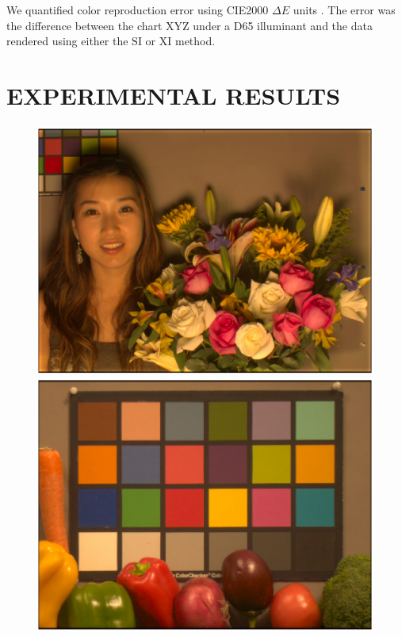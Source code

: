 \documentclass[]{spie}
\newcommand{\XI}{\mathrm{XI}}
\newcommand{\SI}{\mathrm{SI}}
\begin{document}
We quantified color reproduction error using CIE2000 $\Delta E$ units \cite{Sharma2005}. The error was the difference between the chart XYZ under a D65 illuminant and the data rendered using either the $\SI$ or $\XI$ method.

\section{EXPERIMENTAL RESULTS}

\begin{figure}[t]
\begin{center}
\begin{minipage}[b]{0.245\textwidth}
 \includegraphics[width=\textwidth]{Fig3/srgbI_AsianFemaleWithFlowers_RGBW1_Tungsten1_opt2}
 \includegraphics[width=\textwidth]{Fig3/srgbI_Vegetables_RGBW1_Tungsten1_opt2}

\end{minipage}
\end{center}
\end{figure}
\end{document}
